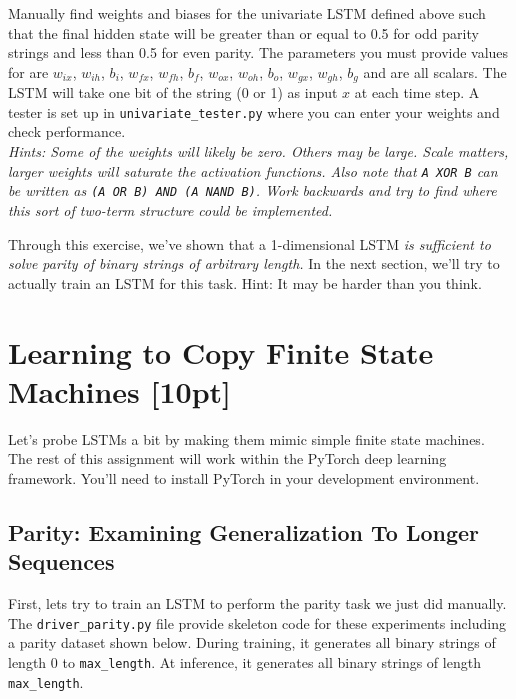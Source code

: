 \documentclass[a4paper,10pt]{article}
\begin{document}
\vspace{5pt}
\begin{taskbox}
 Manually find weights and biases for the univariate LSTM defined above such that the final hidden state will be greater than or equal to 0.5 for odd parity strings and less than 0.5 for even parity. The parameters you must provide values for are $w_{ix}$, $w_{ih}$, $b_i$, $w_{fx}$, $w_{fh}$, $b_f$, $w_{ox}$, $w_{oh}$, $b_o$, $w_{gx}$, $w_{gh}$, $b_g$ and are all scalars. The LSTM will take one bit of the string (0 or 1) as input $x$ at each time step. A tester is set up in \texttt{univariate\_tester.py} where you can enter your weights and check performance. \\[5pt]

\emph{Hints: Some of the weights will likely be zero. Others may be large. Scale matters, larger weights will saturate the activation functions. Also note that \texttt{A XOR B} can be written as \texttt{(A OR B) AND (A NAND B)}. Work backwards and try to find where this sort of two-term structure could be implemented.} 

\end{taskbox}
\vspace{5pt}

\noindent Through this exercise, we've shown that a 1-dimensional LSTM \emph{is sufficient to solve parity of binary strings of arbitrary length.} In the next section, we'll try to actually train an LSTM for this task. Hint: It may be harder than you think.



\section{Learning to Copy Finite State Machines [10pt]}

Let's probe LSTMs a bit by making them mimic simple finite state machines. The rest of this assignment will work within the PyTorch deep learning framework. You'll need to install PyTorch in your development environment. 



\subsection{Parity: Examining Generalization To Longer Sequences}
First, lets try to train an LSTM to perform the parity task we just did manually. The \texttt{driver\_parity.py} file provide skeleton code for these experiments including a parity dataset shown below. During training, it generates all binary strings of length 0 to \texttt{max\_length}. At inference, it generates all binary strings of length \texttt{max\_length}.
\end{document}
